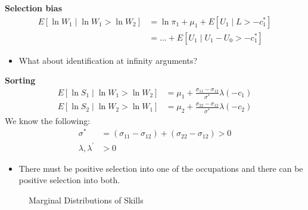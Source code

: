 \begin{frame}
	\textbf{Selection bias}
	\begin{align*}
	E[\ln W_1 \mid \ln W_1 > \ln W_2] & = \ln \pi_1 + \mu_1 + E[U_1 \mid L > -c^*_1] \\
									  & = \hdots + E[U_1 \mid U_1 - U_0 > -c^*_1]
	\end{align*}

	\begin{itemize}
	\item What about identification at infinity arguments?
	\end{itemize}

\end{frame}
\begin{frame}
	\textbf{Sorting}
	\begin{align*}
	E[\ln S_1 \mid \ln W_1 > \ln W_2] & = \mu_1 + \frac{\sigma_{11} - \sigma_{12}}{\sigma^*} \lambda(-c_1) \\
	E[\ln S_2 \mid \ln W_2 > \ln W_1] & = \mu_2 + \frac{\sigma_{22} - \sigma_{12}}{\sigma^*} \lambda(-c_2)
	\end{align*}
	We know the following:
	\begin{align*}
	\sigma^* & = (\sigma_{11} - \sigma_{12}) +  (\sigma_{22} - \sigma_{12}) > 0 \\
	\lambda, \lambda^\prime &> 0
	\end{align*}
	\begin{itemize}\setlength\itemsep{1em}
		\item There must be positive selection into one of the occupations and there can be positive selection into both.
	\end{itemize}
\end{frame}
\begin{frame}
	\begin{figure}[htp]\centering
		\caption{Marginal Distributions of Skills}\label{Marginal Distributions of Skills}
	\end{figure}
\end{frame}
